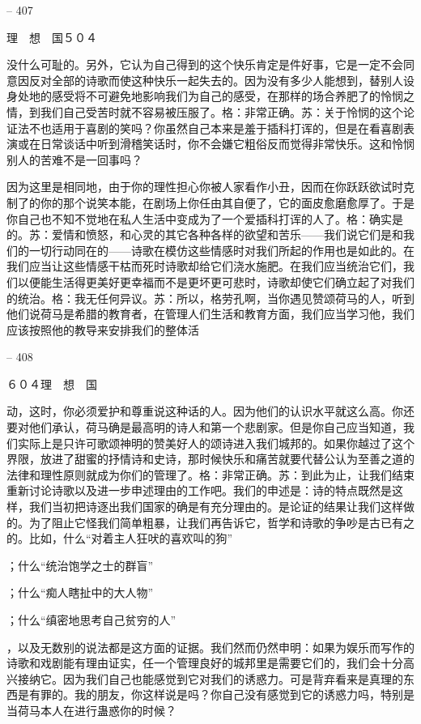 \documentclass[11pt,oneside]{book}
\begin{document}
\begin{common-format}
    

-- 407

    理　想　国５０４

    没什么可耻的。另外，它认为自己得到的这个快乐肯定是件好事，它是一定不会同意因反对全部的诗歌而使这种快乐一起失去的。因为没有多少人能想到，替别人设身处地的感受将不可避免地影响我们为自己的感受，在那样的场合养肥了的怜悯之情，到我们自己受苦时就不容易被压服了。格：非常正确。苏：关于怜悯的这个论证法不也适用于喜剧的笑吗？你虽然自己本来是羞于插科打诨的，但是在看喜剧表演或在日常谈话中听到滑稽笑话时，你不会嫌它粗俗反而觉得非常快乐。这和怜悯别人的苦难不是一回事吗？

    因为这里是相同地，由于你的理性担心你被人家看作小丑，因而在你跃跃欲试时克制了的你的那个说笑本能，在剧场上你任由其自便了，它的面皮愈磨愈厚了。于是你自己也不知不觉地在私人生活中变成为了一个爱插科打诨的人了。格：确实是的。苏：爱情和愤怒，和心灵的其它各种各样的欲望和苦乐——我们说它们是和我们的一切行动同在的——诗歌在模仿这些情感时对我们所起的作用也是如此的。在我们应当让这些情感干枯而死时诗歌却给它们浇水施肥。在我们应当统治它们，我们以便能生活得更美好更幸福而不是更坏更可悲时，诗歌却使它们确立起了对我们的统治。格：我无任何异议。苏：所以，格劳孔啊，当你遇见赞颂荷马的人，听到他们说荷马是希腊的教育者，在管理人们生活和教育方面，我们应当学习他，我们应该按照他的教导来安排我们的整体活

    

-- 408

    ６０４理　想　国

    动，这时，你必须爱护和尊重说这种话的人。因为他们的认识水平就这么高。你还要对他们承认，荷马确是最高明的诗人和第一个悲剧家。但是你自己应当知道，我们实际上是只许可歌颂神明的赞美好人的颂诗进入我们城邦的。如果你越过了这个界限，放进了甜蜜的抒情诗和史诗，那时候快乐和痛苦就要代替公认为至善之道的法律和理性原则就成为你们的管理了。格：非常正确。苏：到此为止，让我们结束重新讨论诗歌以及进一步申述理由的工作吧。我们的申述是：诗的特点既然是这样，我们当初把诗逐出我们国家的确是有充分理由的。是论证的结果让我们这样做的。为了阻止它怪我们简单粗暴，让我们再告诉它，哲学和诗歌的争吵是古已有之的。比如，什么“对着主人狂吠的喜欢叫的狗”

    ；什么“统治饱学之士的群盲”

    ；什么“痴人瞎扯中的大人物”

    ；什么“缜密地思考自己贫穷的人”

    ，以及无数别的说法都是这方面的证据。我们然而仍然申明：如果为娱乐而写作的诗歌和戏剧能有理由证实，任一个管理良好的城邦里是需要它们的，我们会十分高兴接纳它。因为我们自己也能感觉到它对我们的诱惑力。可是背弃看来是真理的东西是有罪的。我的朋友，你这样说是吗？你自己没有感觉到它的诱惑力吗，特别是当荷马本人在进行蛊惑你的时候？


\end{common-format}
\end{document}

